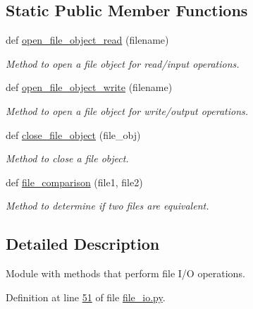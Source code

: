 \subsection*{Static Public Member Functions}
\begin{DoxyCompactItemize}
\item 
def \hyperlink{classutilities_1_1file__io_1_1file__io__operations_a1a7ef324955033ad370338fe37e68194}{open\+\_\+file\+\_\+object\+\_\+read} (filename)
\begin{DoxyCompactList}\small\item\em Method to open a file object for read/input operations. \end{DoxyCompactList}\item 
def \hyperlink{classutilities_1_1file__io_1_1file__io__operations_aaf94e26da1d988ece479d1600ad1de4a}{open\+\_\+file\+\_\+object\+\_\+write} (filename)
\begin{DoxyCompactList}\small\item\em Method to open a file object for write/output operations. \end{DoxyCompactList}\item 
def \hyperlink{classutilities_1_1file__io_1_1file__io__operations_a15cce5bd7767b057cdc569f393c24866}{close\+\_\+file\+\_\+object} (file\+\_\+obj)
\begin{DoxyCompactList}\small\item\em Method to close a file object. \end{DoxyCompactList}\item 
def \hyperlink{classutilities_1_1file__io_1_1file__io__operations_a9b3808ff6b165f5e73b780036f73a917}{file\+\_\+comparison} (file1, file2)
\begin{DoxyCompactList}\small\item\em Method to determine if two files are equivalent. \end{DoxyCompactList}\end{DoxyCompactItemize}


\subsection{Detailed Description}
Module with methods that perform file I/\+O operations. 



Definition at line \hyperlink{file__io_8py_source_l00051}{51} of file \hyperlink{file__io_8py_source}{file\+\_\+io.\+py}.



